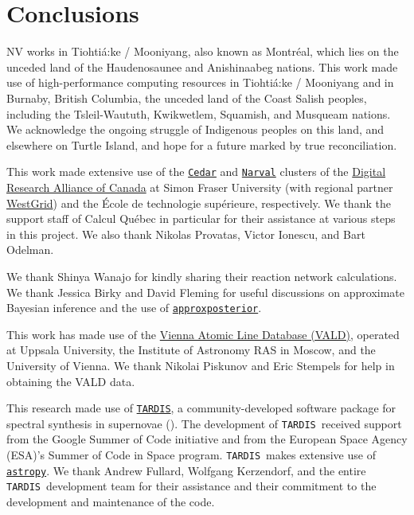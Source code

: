 \documentclass[twocolumn, twocolappendix]{aastex63}
\def\TARDIS{\texttt{TARDIS}}
\def\approxposterior{\texttt{approxposterior}}
\begin{document}

\section{Conclusions}\label{sec:conclusions}



\acknowledgments


NV works in Tiohti{\'a}:ke / Mooniyang, also known as Montr{\'e}al, which lies on the unceded land of the Haudenosaunee and Anishinaabeg nations. This work made use of high-performance computing resources in Tiohti{\'a}:ke / Mooniyang and in Burnaby, British Columbia, the unceded land of the Coast Salish peoples, including the Tsleil-Waututh, Kwikwetlem, Squamish, and Musqueam nations. We acknowledge the ongoing struggle of Indigenous peoples on this land, and elsewhere on Turtle Island, and hope for a future marked by true reconciliation. 

This work made extensive use of the \href{https://docs.alliancecan.ca/wiki/Cedar}{\texttt{Cedar}} and \href{https://docs.alliancecan.ca/wiki/Narval/en}{\texttt{Narval}} clusters of the \href{https://alliancecan.ca/en}{Digital Research Alliance of Canada} at Simon Fraser University (with regional partner \href{https://www.westgrid.ca/}{WestGrid}) and the {\'E}cole de technologie sup{\'e}rieure, respectively. We thank the support staff of Calcul Qu{\'e}bec in particular for their assistance at various steps in this project. We also thank Nikolas Provatas, Victor Ionescu, and Bart Odelman.

We thank Shinya Wanajo for kindly sharing their reaction network calculations. We thank Jessica Birky and David Fleming for useful discussions on approximate Bayesian inference and the use of \href{https://dflemin3.github.io/approxposterior/index.html}{\approxposterior}.

This work has made use of the \href{http://vald.astro.uu.se/~vald/php/vald.php}{Vienna Atomic Line Database (VALD)}, operated at Uppsala University, the Institute of Astronomy RAS in Moscow, and the University of Vienna. We thank Nikolai Piskunov and Eric Stempels for help in obtaining the VALD data.

This research made use of \href{https://tardis-sn.github.io/tardis/index.html}{\TARDIS}, a community-developed software package for spectral synthesis in supernovae (\citealt{kerzendorf14}). The development of \TARDIS~received support from the Google Summer of Code initiative and from the European Space Agency (ESA)'s Summer of Code in Space program. \TARDIS~makes extensive use of \href{https://docs.astropy.org/en/stable/}{\texttt{astropy}}. We thank Andrew Fullard, Wolfgang Kerzendorf, and the entire \TARDIS~development team for their assistance and their commitment to the development and maintenance of the code. 
\end{document}
